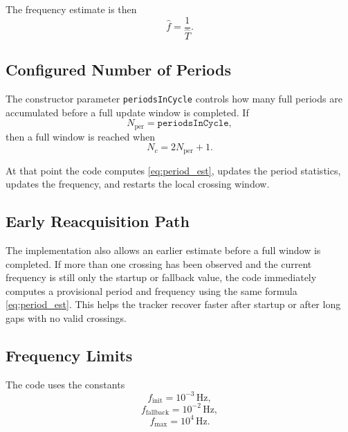 \documentclass[conference]{IEEEtran}
\begin{document}
    The frequency estimate is then
    \begin{equation}
        \hat f = \frac{1}{\hat T}.
    \end{equation}

    \subsection{Configured Number of Periods}

    The constructor parameter \texttt{periodsInCycle} controls how many full
    periods are accumulated before a full update window is completed. If
    \begin{equation}
        N_{\mathrm{per}} = \texttt{periodsInCycle},
    \end{equation}
    then a full window is reached when
    \begin{equation}
        N_c = 2N_{\mathrm{per}} + 1.
    \end{equation}

    At that point the code computes \eqref{eq:period_est}, updates the period
    statistics, updates the frequency, and restarts the local crossing window.

    \subsection{Early Reacquisition Path}

    The implementation also allows an earlier estimate before a full window is
    completed. If more than one crossing has been observed and the current
    frequency is still only the startup or fallback value, the code immediately
    computes a provisional period and frequency using the same formula
    \eqref{eq:period_est}. This helps the tracker recover faster after startup or
    after long gaps with no valid crossings.

    \subsection{Frequency Limits}

    The code uses the constants
    \begin{equation}
        f_{\mathrm{init}} = 10^{-3}\,\text{Hz},
    \end{equation}
    \begin{equation}
        f_{\mathrm{fallback}} = 10^{-2}\,\text{Hz},
    \end{equation}
    \begin{equation}
        f_{\max} = 10^{4}\,\text{Hz}.
    \end{equation}
\end{document}
